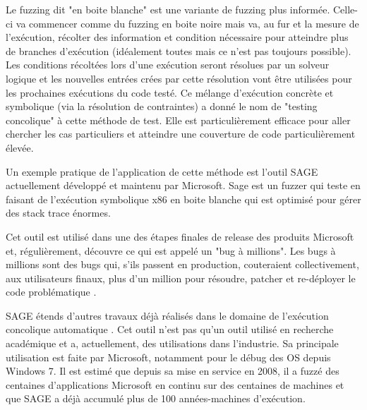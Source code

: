 \documentclass[a4paper]{report}
\begin{document}
Le fuzzing dit "en boite blanche" est une variante de fuzzing plus informée.
Celle-ci va commencer comme du fuzzing en boite noire mais va, au fur et la mesure de l'exécution, récolter des information et condition nécessaire pour atteindre plus de branches d'exécution (idéalement toutes mais ce n'est pas toujours possible).
Les conditions récoltées lors d'une exécution seront résolues par un solveur logique et les nouvelles entrées crées par cette résolution vont être utilisées pour les prochaines exécutions du code testé.
Ce mélange d'exécution concrète et symbolique (via la résolution de contraintes) a donné le nom de "testing concolique" à cette méthode de test.
Elle est particulièrement efficace pour aller chercher les cas particuliers et atteindre une couverture de code particulièrement élevée.

Un exemple pratique de l'application de cette méthode est l'outil SAGE actuellement développé et maintenu par Microsoft\cite{godefroid2008automated}.
Sage est un fuzzer qui teste en faisant de l'exécution symbolique x86 en boite blanche qui est optimisé pour gérer des stack trace énormes\cite{Godefroid2020}.

Cet outil est utilisé dans une des étapes finales de release des produits Microsoft et, régulièrement, découvre ce  qui est appelé un "bug à millions".
Les bugs à millions sont des bugs qui, s’ils passent en production, couteraient collectivement, aux utilisateurs finaux, plus d'un million pour résoudre, patcher et re-déployer le code problématique \cite{Godefroid2012}.

SAGE étends d'autres travaux déjà réalisés dans le domaine de l'exécution concolique automatique \cite{Godefroid2020} \cite{cadar2005execution} \cite{godefroid2005dart}.
Cet outil n'est pas qu'un outil utilisé en recherche académique et a, actuellement, des utilisations dans l'industrie.
Sa principale utilisation est faite par Microsoft, notamment pour le débug des OS depuis Windows 7.
Il est estimé que depuis sa mise en service en 2008, il a fuzzé des centaines d'applications Microsoft en continu sur des centaines de machines et que SAGE a déjà accumulé plus de 100 années-machines d'exécution\cite{Godefroid2012}.
\end{document}

